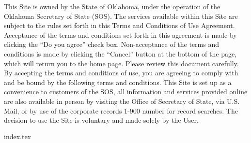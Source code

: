 This Site is owned by the State of Oklahoma, under the operation of the Oklahoma
Secretary of State (SOS). The services available within this Site are subject to
the rules set forth in this Terms and Conditions of Use Agreement. Acceptance of
the terms and conditions set forth in this agreement is made by clicking the
``Do you agree'' check box. Non-acceptance of the terms and conditions is made
by clicking the ``Cancel'' button at the bottom of the page, which will return
you to the home page. Please review this document carefully. By accepting the
terms and conditions of use, you are agreeing to comply with and be bound by the
following terms and conditions. This Site is set up as a convenience to
customers of the SOS, all information and services provided online are also
available in person by visiting the Office of Secretary of State, via U.S. Mail,
or by use of the corporate records 1-900 number for record searches. The
decision to use the Site is voluntary and made solely by the User.

{index.tex}